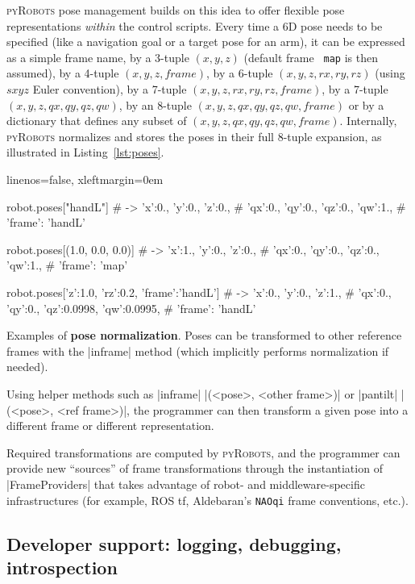 \documentclass[letterpaper, 10pt, conference]{ieeeconf}      %
\newcommand{\pyRobots}{\textsc{pyRobots}}
\begin{document}
\pyRobots{} pose management builds on this idea to offer flexible pose
representations \emph{within} the control scripts. Every time a 6D pose needs to
be specified (like a navigation goal or a target pose for an arm), it can be
expressed as a simple frame name, by a 3-tuple $(x, y, z)$ (default frame {\tt
map} is then assumed), by a 4-tuple $(x, y, z, frame)$, by a 6-tuple $(x, y, z,
rx, ry, rz)$ (using $sxyz$ Euler convention), by a 7-tuple $(x, y, z, rx, ry,
rz, frame)$, by a 7-tuple $(x, y, z, qx, qy, qz, qw)$, by an 8-tuple $(x, y, z,
qx, qy, qz, qw, frame)$ or by a dictionary that defines any subset of $(x, y, z,
qx, qy, qz, qw, frame)$.  Internally, \pyRobots{} normalizes and stores the
poses in their full 8-tuple expansion, as illustrated in
Listing~\ref{lst:poses}.

\begin{listing}
    \begin{pythoncode*}{linenos=false, xleftmargin=0em}

    robot.poses["handL"]
    # -> {'x':0., 'y':0., 'z':0., 
    #    'qx':0., 'qy':0., 'qz':0., 'qw':1., 
    #    'frame': 'handL'}

    robot.poses[(1.0, 0.0, 0.0)]
    # -> {'x':1., 'y':0., 'z':0., 
    #    'qx':0., 'qy':0., 'qz':0., 'qw':1., 
    #    'frame': 'map'}

    robot.poses[{'z':1.0, 'rz':0.2, 'frame':'handL'}]
    # -> {'x':0., 'y':0., 'z':1., 
    #    'qx':0., 'qy':0., 'qz':0.0998, 'qw':0.0995, 
    #    'frame': 'handL'}

\end{pythoncode*}
\caption{Examples of \textbf{pose normalization}. Poses can be transformed to
other reference frames with the \python|inframe| method (which implicitly performs
normalization if needed).}
\label{lst:poses}
\end{listing}

Using helper methods such as \python|inframe| \python|(<pose>, <other frame>)| or
\python|pantilt| \python|(<pose>, <ref frame>)|, the programmer can then
transform a given pose into a different frame or different representation.

Required transformations are computed by \pyRobots{}, and the programmer can
provide new ``sources'' of frame transformations through the instantiation of
\python|FrameProviders| that takes advantage of robot- and middleware-specific
infrastructures (for example, ROS {\sc tf}, Aldebaran's {\tt NAOqi} frame
conventions, etc.).

\subsection{Developer support: logging, debugging, introspection}
\label{}
\end{document}
